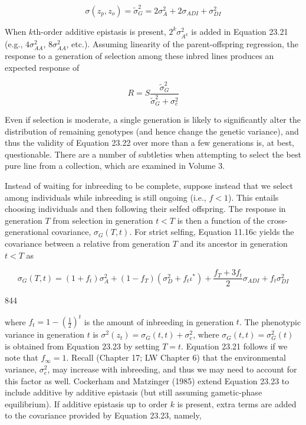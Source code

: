 \documentclass{article}
\begin{document}
\begin{equation}
\sigma(z_{p},z_{o})=\widetilde{\sigma}_{G}^{2}=2\sigma_{A}^{2}+2\sigma_{ADI}+\sigma_{DI}^{2}
\tag{23.21}
\label{eq:23_21}
\end{equation}

When  $ k $th-order additive epistasis is present,  $ 2^k \sigma_{A^k}^2 $ is added in Equation 23.21 (e.g.,  $ 4\sigma_{AA}^2 $,  $ 8\sigma_{AA}^2 $, etc.). Assuming linearity of the parent-offspring regression, the response to a generation of selection among these inbred lines produces an expected response of

\begin{equation}
R=S\frac{\widetilde{\sigma}_{G}^{2}}{\widetilde{\sigma}_{G}^{2}+\sigma_{e}^{2}}
\tag{23.22}
\label{eq:23_22}
\end{equation}

Even if selection is moderate, a single generation is likely to significantly alter the distribution of remaining genotypes (and hence change the genetic variance), and thus the validity of Equation 23.22 over more than a few generations is, at best, questionable. There are a number of subtleties when attempting to select the best pure line from a collection, which are examined in Volume 3.

Instead of waiting for inbreeding to be complete, suppose instead that we select among individuals while inbreeding is still ongoing (i.e., $f < 1$). This entails choosing individuals and then following their selfed offspring. The response in generation $T$ from selection in generation $t < T$ is then a function of the cross-generational covariance, $\sigma_{G}(T, t)$. For strict selfing, Equation 11.16c yields the covariance between a relative from generation $T$ and its ancestor in generation $t < T$ as

\begin{equation}
\sigma_{G}(T,t)=(1+f_{t})\sigma_{A}^{2}+(1-f_{T})(\sigma_{D}^{2}+f_{t}\iota^{*})+\frac{f_{T}+3f_{t}}{2}\sigma_{ADI}+f_{t}\sigma_{DI}^{2}
\tag{23.23}
\label{eq:23_23}
\end{equation}

844

where  $ f_t = 1 - \left(\frac{1}{2}\right)^t $ is the amount of inbreeding in generation  $ t $. The phenotypic variance in generation  $ t $ is  $ \sigma^2(z_t) = \sigma_G(t, t) + \sigma_e^2 $, where  $ \sigma_G(t, t) = \sigma_G^2(t) $ is obtained from Equation 23.23 by setting  $ T = t $. Equation 23.21 follows if we note that  $ f_\infty = 1 $. Recall (Chapter 17; LW Chapter 6) that the environmental variance,  $ \sigma_e^2 $, may increase with inbreeding, and thus we may need to account for this factor as well. Cockerham and Matzinger (1985) extend Equation 23.23 to include additive by additive epistasis (but still assuming gametic-phase equilibrium). If additive epistasis up to order  $ k $ is present, extra terms are added to the covariance provided by Equation 23.23, namely,
\end{document}
